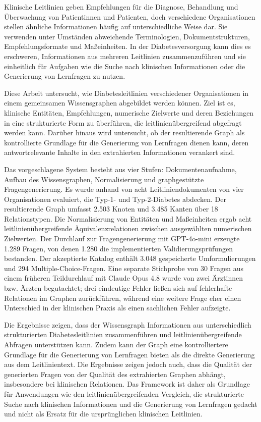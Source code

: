 Klinische Leitlinien geben Empfehlungen für die Diagnose, Behandlung und Überwachung von Patientinnen und Patienten, doch verschiedene Organisationen stellen ähnliche Informationen häufig auf unterschiedliche Weise dar. Sie verwenden unter Umständen abweichende Terminologien, Dokumentstrukturen, Empfehlungsformate und Maßeinheiten. In der Diabetesversorgung kann dies es erschweren, Informationen aus mehreren Leitlinien zusammenzuführen und sie einheitlich für Aufgaben wie die Suche nach klinischen Informationen oder die Generierung von Lernfragen zu nutzen.

Diese Arbeit untersucht, wie Diabetesleitlinien verschiedener Organisationen in einem gemeinsamen Wissensgraphen abgebildet werden können. Ziel ist es, klinische Entitäten, Empfehlungen, numerische Zielwerte und deren Beziehungen in eine strukturierte Form zu überführen, die leitlinienübergreifend abgefragt werden kann. Darüber hinaus wird untersucht, ob der resultierende Graph als kontrollierte Grundlage für die Generierung von Lernfragen dienen kann, deren antwortrelevante Inhalte in den extrahierten Informationen verankert sind.

Das vorgeschlagene System besteht aus vier Stufen: Dokumentenaufnahme, Aufbau des Wissensgraphen, Normalisierung und graphgestützte Fragengenerierung. Es wurde anhand von acht Leitliniendokumenten von vier Organisationen evaluiert, die Typ-1- und Typ-2-Diabetes abdecken. Der resultierende Graph umfasst 2.503 Knoten und 3.485 Kanten über 18 Relationstypen. Die Normalisierung von Entitäten und Maßeinheiten ergab acht leitlinienübergreifende Äquivalenzrelationen zwischen ausgewählten numerischen Zielwerten. Der Durchlauf zur Fragengenerierung mit GPT-4o-mini erzeugte 1.289 Fragen, von denen 1.280 die implementierten Validierungsprüfungen bestanden. Der akzeptierte Katalog enthält 3.048 gespeicherte Umformulierungen und 294 Multiple-Choice-Fragen. Eine separate Stichprobe von 30 Fragen aus einem früheren Teildurchlauf mit
Claude Opus 4.8 wurde von zwei Ärztinnen bzw. Ärzten begutachtet; drei eindeutige Fehler ließen sich auf fehlerhafte Relationen im Graphen zurückführen, während eine weitere Frage eher einen Unterschied in der klinischen Praxis als einen sachlichen Fehler aufzeigte.

Die Ergebnisse zeigen, dass der Wissensgraph Informationen aus unterschiedlich strukturierten Diabetesleitlinien zusammenführen und leitlinienübergreifende Abfragen unterstützen kann. Zudem kann der Graph eine kontrolliertere Grundlage für die Generierung von Lernfragen bieten als die direkte Generierung aus dem Leitlinientext. Die Ergebnisse zeigen jedoch auch, dass die Qualität der generierten Fragen von der Qualität des extrahierten Graphen abhängt, insbesondere bei klinischen Relationen. Das Framework ist daher als Grundlage für Anwendungen wie den leitlinienübergreifenden Vergleich, die strukturierte Suche nach klinischen Informationen und die Generierung von Lernfragen gedacht und nicht als Ersatz für die ursprünglichen klinischen Leitlinien.